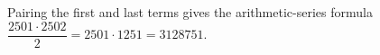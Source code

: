 Pairing the first and last terms gives the arithmetic-series formula $\dfrac{2501\cdot2502}{2}=2501\cdot1251=\boxed{3128751}$.

